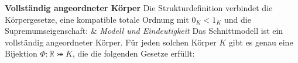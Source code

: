 \begin{BandUebersicht}
\textbf{Vollständig angeordneter Körper}
Die Strukturdefinition verbindet die Körpergesetze, eine kompatible
totale Ordnung mit \(0_K<1_K\) und die Supremumseigenschaft:
&
\textit{Modell und Eindeutigkeit}
Das Schnittmodell ist ein vollständig angeordneter Körper.
Für jeden solchen Körper \(K\) gibt es genau eine Bijektion
\(\Phi\colon\mathbb R\bij K\), die die folgenden Gesetze erfüllt:
\\
\end{BandUebersicht}
